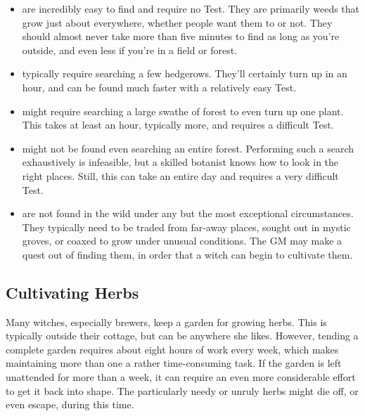 \begin{itemize}
	\item
		 are incredibly easy to find and require no Test.
		They are primarily weeds that grow just about everywhere, whether people want them to or not.
		They should almost never take more than five minutes to find as long as you're outside, and even less if you're in a field or forest.
	\item
		 typically require searching a few hedgerows.
		They'll certainly turn up in an hour, and can be found much faster with a relatively easy Test.
	\item
		 might require searching a large swathe of forest to even turn up one plant.
		This takes at least an hour, typically more, and requires a difficult Test.
	\item
		 might not be found even searching an entire forest.
		Performing such a search exhaustively is infeasible, but a skilled botanist knows how to look in the right places.
		Still, this can take an entire day and requires a very difficult Test.
	\item
		 are not found in the wild under any but the most exceptional circumstances.
		They typically need to be traded from far-away places, sought out in mystic groves, or coaxed to grow under unusual conditions.
		The GM may make a quest out of finding them, in order that a witch can begin to cultivate them.
\end{itemize}

\subsection{Cultivating Herbs}

Many witches, especially brewers, keep a garden for growing herbs.
This is typically outside their cottage, but can be anywhere she likes.
However, tending a complete garden requires about eight hours of work every week, which makes maintaining more than one a rather time-consuming task.
If the garden is left unattended for more than a week, it can require an even more considerable effort to get it back into shape.
The particularly needy or unruly herbs might die off, or even escape, during this time.

